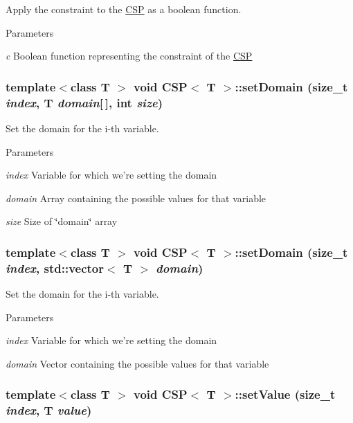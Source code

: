 Apply the constraint to the \hyperlink{classCSP}{CSP} as a boolean function. 


\begin{DoxyParams}{Parameters}
\item[{\em c}]Boolean function representing the constraint of the \hyperlink{classCSP}{CSP} \end{DoxyParams}
\hypertarget{classCSP_a65518e67e33e31bff1b5f9aabdf80a01}{
\subsubsection[{setDomain}]{\setlength{\rightskip}{0pt plus 5cm}template$<$class T $>$ void {\bf CSP}$<$ T $>$::setDomain (size\_\-t {\em index}, \/  T {\em domain}\mbox{[}$\,$\mbox{]}, \/  int {\em size})}}
\label{classCSP_a65518e67e33e31bff1b5f9aabdf80a01}


Set the domain for the i-\/th variable. 


\begin{DoxyParams}{Parameters}
\item[{\em index}]Variable for which we're setting the domain \item[{\em domain}]Array containing the possible values for that variable \item[{\em size}]Size of \char`\"{}domain\char`\"{} array \end{DoxyParams}
\hypertarget{classCSP_a4017c17aac9d3e96d0e821ebbe09da7b}{
\subsubsection[{setDomain}]{\setlength{\rightskip}{0pt plus 5cm}template$<$class T $>$ void {\bf CSP}$<$ T $>$::setDomain (size\_\-t {\em index}, \/  std::vector$<$ T $>$ {\em domain})}}
\label{classCSP_a4017c17aac9d3e96d0e821ebbe09da7b}


Set the domain for the i-\/th variable. 


\begin{DoxyParams}{Parameters}
\item[{\em index}]Variable for which we're setting the domain \item[{\em domain}]Vector containing the possible values for that variable \end{DoxyParams}
\hypertarget{classCSP_ac25064c5b2d4e1020173b56913251ebd}{
\subsubsection[{setValue}]{\setlength{\rightskip}{0pt plus 5cm}template$<$class T $>$ void {\bf CSP}$<$ T $>$::setValue (size\_\-t {\em index}, \/  T {\em value})}}
\label{classCSP_ac25064c5b2d4e1020173b56913251ebd}


